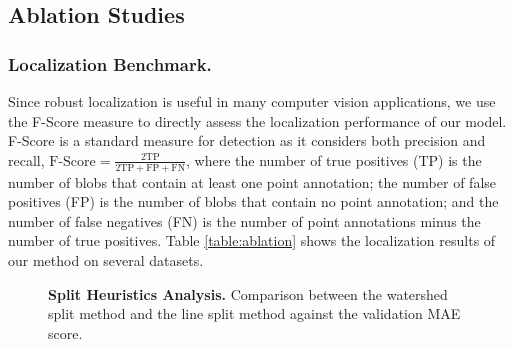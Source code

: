 \documentclass[runningheads]{llncs}
\begin{document}
\subsection{Ablation Studies}\label{sec:ablation}


\subsubsection{Localization Benchmark.} Since robust localization is useful in many computer vision applications, we use the F-Score measure to directly assess the localization performance of our model. F-Score is a standard measure for detection as it considers both precision and recall, $\text{F-Score} =\frac{2\text{TP}}{2\text{TP} + \text{FP} + \text{FN}}$, where the number of true positives (TP) is the number of blobs that contain at least one point annotation; the number of false positives (FP) is the number of blobs that contain no point annotation; and the number of false negatives (FN) is the number of point annotations minus the number of true positives. Table \ref{table:ablation} shows the localization results of our method on several datasets.






\begin{figure}
\caption{{\bf Split Heuristics Analysis.} Comparison between the watershed split method and the line split method against the validation MAE score.}
\label{fig:crowd2}
\hspace{-0.35in}
\begin{floatrow}
{\label{tab:res-pascal}}
\hspace{-2.8in}
\end{floatrow}
\end{figure}
\end{document}
